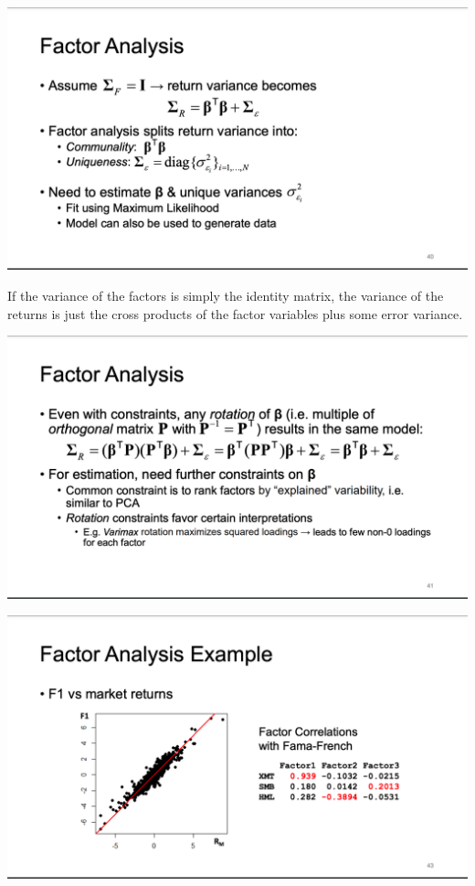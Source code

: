 \documentclass[
  oneside]{book}
\begin{document}
\includegraphics{Notes/Obsidian-Attachments/6-Factor-Models-2.png}

If the variance of the factors is simply the identity matrix, the variance of the returns is just the cross products of the factor variables plus some error variance.

\includegraphics{Notes/Obsidian-Attachments/6-Factor-Models-3.png}

\includegraphics{Notes/Obsidian-Attachments/6-Factor-Models-4.png}
\end{document}
